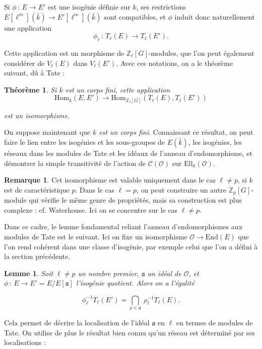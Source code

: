 \documentclass[11pt,a4paper]{article}
\newcommand{\Z}{\mathbb{Z}}
\renewcommand{\O}{\mathcal{O}}
\newcommand{\Cl}{\mathcal{C}}
\newcommand{\vers}{\longrightarrow}
\newcommand{\End}{\mathrm{End}}
\newcommand{\Hom}{\mathrm{Hom}}
\newcommand{\Ell}{\mathrm{Ell}}
\renewcommand{\frak}{\mathfrak}
\newcommand{\de}{\,:\,}
\newtheorem*{thm}{Théorème}
\newtheorem*{lem}{Lemme}
\theoremstyle{definition}
\newtheorem*{rem}{Remarque}
\begin{document}
Si $\phi\de E\vers E'$ est une isogénie définie sur $k$, ses restrictions $E[\ell^m](\bar{k})\vers E'[\ell^m](\bar{k})$ sont compatibles, et $\phi$ induit donc naturellement une application
$$ \phi_\ell\de T_\ell(E)\vers T_\ell(E').$$

Cette application est un morphisme de $\Z_\ell[G]$-modules, que l'on peut également considérer de $V_\ell(E)$ dans $V_\ell(E')$. Avec ces notations, on a le théorème suivant, dû à Tate :

\begin{thm} Si $k$ est un corps fini, cette application
$$\Hom_k(E, E') \vers \Hom_{\Z_\ell[G]} (T_\ell(E), T_\ell(E'))$$

est un isomorphisme.
\end{thm}

On suppose maintenant que \emph{$k$ est un corps fini}. Connaissant ce résultat, on peut faire le lien entre les isogénies et les sous-groupes de $E(\bar{k})$, les isogénies, les réseaux dans les modules de Tate et les idéaux de l'anneau d'endomorphisme, et démontrer la simple transitivité de l'action de $\Cl(\O)$ sur $\Ell_k(\O)$.

\begin{rem}

Cet isomorphisme est valable uniquement dans le cas $\ell\neq p$, si $k$ est de caractéristique $p$. Dans le cas $\ell=p$, on peut construire un autre $\Z_p[G]$-module qui vérifie le même genre de propriétés, mais sa construction est plus complexe : cf. Waterhouse. Ici on se concentre sur le cas $\ell\neq p$.

\end{rem}

Dans ce cadre, le lemme fondamental reliant l'anneau d'endomorphismes aux modules de Tate est le suivant. Ici on fixe un isomorphisme $\O\vers \End(E)$ que l'on rend cohérent dans une classe d'isogénie, par exemple celui que l'on a défini à la section précédente.

\begin{lem}

Soit $\ell\neq p$ un nombre premier, $\frak a$ un idéal de $\O$, et $\phi\de E\vers E' = E/E[\frak a]$ l'isogénie quotient. Alors on a l'égalité

$$\phi_\ell^{-1} T_\ell(E') = \bigcap_{\rho\in\frak a}\ \rho_\ell^{-1} T_\ell(E) .$$
\end{lem}

Cela permet de décrire la localisation de l'idéal $\frak a$ en $\ell$ en termes de modules de Tate. On utilise de plus le résultat bien connu qu'un réseau est déterminé par ses localisations :
\end{document}
